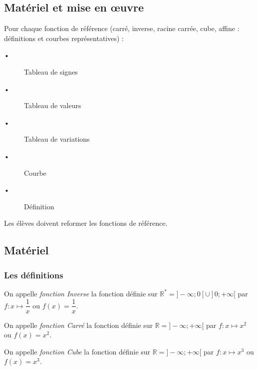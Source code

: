 \begin{titre}

\end{titre}


\subsection*{Matériel et mise en œuvre}

Pour chaque fonction de référence (carré, inverse, racine carrée, cube, affine : définitions et courbes représentatives) :

\begin{description}
 \item[•] Tableau de signes
  \item[•] Tableau de valeurs
 \item[•] Tableau de variations   
  \item[•] Courbe
  \item[•] Définition
 \end{description} 

Les élèves doivent reformer les fonctions de référence.  


\subsection*{Matériel}
 
 
\subsubsection*{Les définitions}


\begin{DefN}
On appelle \emph{fonction Inverse} la fonction définie sur $\mathbb{R}^*=]-\infty;0[\cup]0;+\infty[$ par $f : x\mapsto \dfrac{1}{x}$ ou $f(x)=\dfrac{1}{x}$.
\end{DefN}

\vspace{0.4cm}

\begin{DefN}
On appelle \emph{fonction Carré} la fonction définie sur $\mathbb{R}=]-\infty;+\infty[$ par $f : x\mapsto  x^2$ ou $f(x)=x^2$. 
\end{DefN}

\vspace{0.4cm} 

\begin{DefN}
On appelle \emph{fonction Cube} la fonction définie sur $\mathbb{R}=]-\infty;+\infty[$ par $f : x\mapsto  x^3$ ou $f(x)=x^3$. 
\end{DefN}

